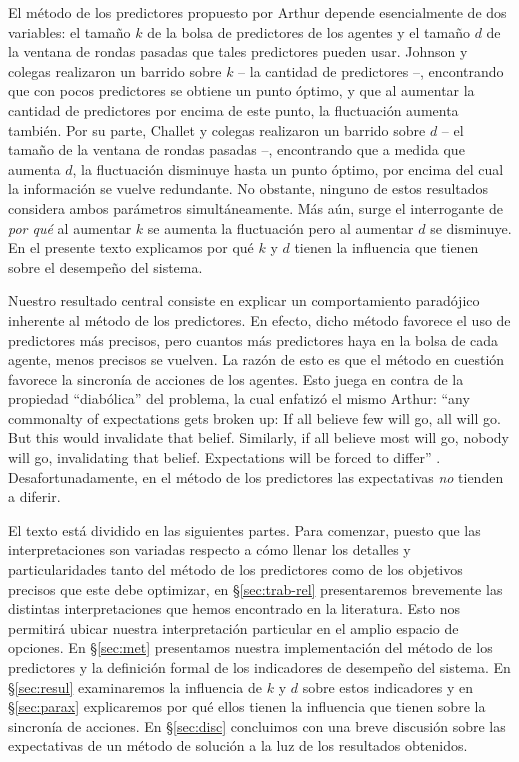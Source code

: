 \documentclass[11pt]{amsart}
\begin{document}
El método de los predictores propuesto por Arthur depende esencialmente de dos variables: el tamaño $k$ de la bolsa de predictores de los agentes y el tamaño $d$ de la ventana de rondas pasadas que tales predictores pueden usar. Johnson y colegas \cite{Johnson1998} realizaron un barrido sobre $k$ -- la cantidad de predictores --, encontrando que con pocos predictores se obtiene un punto óptimo, y que al aumentar la cantidad de predictores por encima de este punto, la fluctuación aumenta también. Por su parte, Challet y colegas \cite{Challet2004} realizaron un barrido sobre $d$ -- el tamaño de la ventana de rondas pasadas --, encontrando que a medida que aumenta $d$, la fluctuación disminuye hasta un punto óptimo, por encima del cual la información se vuelve redundante. No obstante, ninguno de estos resultados considera ambos parámetros simultáneamente. Más aún, surge el interrogante de \emph{por qué} al aumentar $k$ se aumenta la fluctuación pero al aumentar $d$ se disminuye. En el presente texto explicamos por qué $k$ y $d$ tienen la influencia que tienen sobre el desempeño del sistema. 

Nuestro resultado central consiste en explicar un comportamiento paradójico inherente al método de los predictores. En efecto, dicho método favorece el uso de predictores más precisos, pero cuantos más predictores haya en la bolsa de cada agente, menos precisos se vuelven. La razón de esto es que el método en cuestión favorece la sincronía de acciones de los agentes. Esto juega en contra de la propiedad “diabólica” del problema, la cual enfatizó el mismo Arthur: “any commonalty of expectations gets broken up: If all believe few will go, all will go. But this would invalidate that belief. Similarly, if all believe most will go, nobody will go, invalidating that belief. Expectations will be forced to differ” \cite[p.~409]{Arthur1994}. Desafortunadamente, en el método de los predictores las expectativas \emph{no} tienden a diferir.

El texto está dividido en las siguientes partes. Para comenzar, puesto que las interpretaciones son variadas respecto a cómo llenar los detalles y particularidades tanto del método de los predictores como de los objetivos precisos que este debe optimizar, en \S\ref{sec:trab-rel} presentaremos brevemente las distintas interpretaciones que hemos encontrado en la literatura. Esto nos permitirá ubicar nuestra interpretación particular en el amplio espacio de opciones. En \S\ref{sec:met} presentamos nuestra implementación del método de los predictores y la definición formal de los indicadores de desempeño del sistema. En \S\ref{sec:resul} examinaremos la influencia de $k$ y $d$ sobre estos indicadores y en \S\ref{sec:parax} explicaremos por qué ellos tienen la influencia que tienen sobre la sincronía de acciones. En \S\ref{sec:disc} concluimos con una breve discusión sobre las expectativas de un método de solución a la luz de los resultados obtenidos.
\end{document}
